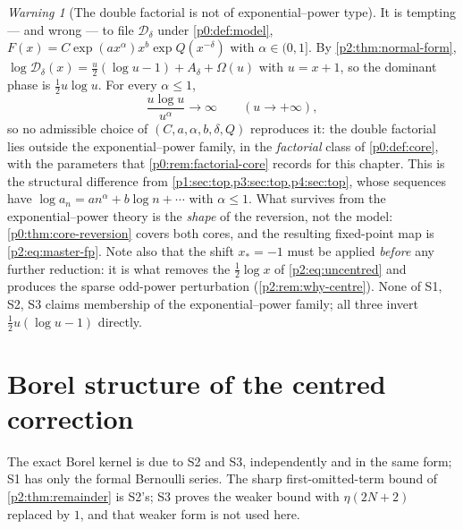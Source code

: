 \documentclass[11pt,a4paper,oneside]{book}
\theoremstyle{plain}
\theoremstyle{definition}
\theoremstyle{remark}
\newtheorem{warning}[theorem]{Warning}
\begin{document}
\begin{warning}[The double factorial is not of exponential--power type]
\label{p2:rem:not-exponential-power}
It is tempting --- and wrong --- to file \(\mathcal D_\delta\) under
\cref{p0:def:model}, \(F(x)=C\exp(ax^\alpha)x^b\exp Q(x^{-\delta})\) with
\(\alpha\in(0,1]\).  By \cref{p2:thm:normal-form},
\(\log\mathcal D_\delta(x)=\tfrac u2(\log u-1)+A_\delta+\Omega(u)\) with
\(u=x+1\), so the dominant phase is \(\tfrac12u\log u\).  For every
\(\alpha\le1\),
\[
 \frac{u\log u}{u^\alpha}\longrightarrow\infty
 \qquad(u\to+\infty),
\]
so no admissible choice of \((C,a,\alpha,b,\delta,Q)\) reproduces it: the
double factorial lies outside the exponential--power family, in the
\emph{factorial} class of \cref{p0:def:core}, with the parameters that
\cref{p0:rem:factorial-core} records for this chapter.  This is
the structural difference from
\cref{p1:sec:top,p3:sec:top,p4:sec:top}, whose sequences have
\(\log a_n=an^\alpha+b\log n+\cdots\) with \(\alpha\le1\).  What survives from
the exponential--power theory is the \emph{shape} of the reversion, not the
model: \cref{p0:thm:core-reversion} covers both cores, and the resulting
fixed-point map is \cref{p2:eq:master-fp}.  Note also that the shift
\(x_*=-1\) must be applied \emph{before} any further reduction: it is what
removes the \(\tfrac12\log x\) of \cref{p2:eq:uncentred} and produces the
sparse odd-power perturbation (\cref{p2:rem:why-centre}).
None of \textsf{S1}, \textsf{S2}, \textsf{S3} claims membership of the
exponential--power family; all three invert \(\tfrac12u(\log u-1)\) directly.
\end{warning}

\section{Borel structure of the centred correction}
\label{p2:sec:borel}

\begin{sourcebox}
The exact Borel kernel is due to \textsf{S2} and \textsf{S3}, independently and
in the same form; \textsf{S1} has only the formal Bernoulli series.  The sharp
first-omitted-term bound of \cref{p2:thm:remainder} is \textsf{S2}'s;
\textsf{S3} proves the weaker bound with \(\eta(2N+2)\) replaced by \(1\), and
that weaker form is not used here.
\end{sourcebox}
\end{document}
